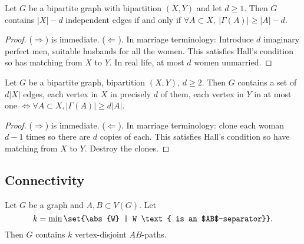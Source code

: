 \documentclass{article}
\begin{document}
\begin{ncor}\label{cor:32}
    Let $G$ be a bipartite graph with bipartition $(X,Y)$ and let $d \geq 1$.
    Then $G$ contains $|X|-d$ independent edges if and only if $\forall A \subset X, \ |\Gamma(A)| \geq |A| - d$.
\end{ncor}
\begin{proof}
    ($\Rightarrow$) is immediate.
    ($\Leftarrow$). In marriage terminology: Introduce $d$ imaginary perfect men, suitable husbands for all the women.
    This satisfies Hall's condition so has matching from $X$ to $Y$.
    In real life, at most $d$ women unmarried.
\end{proof}
\begin{ncor}\label{cor:33}
    Let $G$ be a bipartite graph, bipartition $(X,Y)$, $d \geq 2$.
    Then $G$ contains a set of $d |X|$ edges, each vertex in $X$ in precisely $d$ of them, each vertex in $Y$ in at most one $\iff \forall A \subset X, |\Gamma(A)| \geq d |A|$.
\end{ncor}
\begin{proof}
    ($\Rightarrow$) is immediate.
    ($\Leftarrow$). In marriage terminology: clone each woman $d-1$ times so there are $d$ copies of each.
    This satisfies Hall's condition so have matching from $X$ to $Y$.
    Destroy the clones.
\end{proof}


\subsection{Connectivity}
























\begin{nthm}\label{thm:34}
    Let $G$ be a graph and $A,B \subset V(G)$.
    Let
    \begin{equation*}
        k = \min \set{\abs{W} | W \text{ is an $AB$-separator}}.
    \end{equation*}
    Then $G$ contains $k$ vertex-disjoint $AB$-paths.
\end{nthm}
\end{document}
